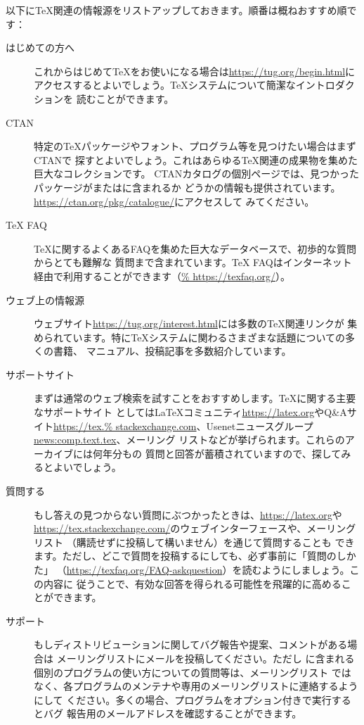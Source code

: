 \documentclass[uplatex,dvipdfmx,12pt]{jsarticle}
\begin{document}
以下に\TeX 関連の情報源をリストアップしておきます。順番は概ねおすすめ順です：
%
\begin{description}
\item[はじめての方へ]
これからはじめて\TeX をお使いになる場合は\url{https://tug.org/begin.html}に
アクセスするとよいでしょう。\TeX システムについて簡潔なイントロダクションを
読むことができます。

\item[CTAN]
特定の\TeX パッケージやフォント、プログラム等を見つけたい場合はまずCTANで
探すとよいでしょう。これはあらゆる\TeX 関連の成果物を集めた巨大なコレクションです。
CTANカタログの個別ページでは、見つかったパッケージが\TL または\MIKTEX に含まれるか
どうかの情報も提供されています。\url{https://ctan.org/pkg/catalogue/}にアクセスして
みてください。

\item[{\TeX} FAQ]
\TeX に関するよくあるFAQを集めた巨大なデータベースで、初歩的な質問からとても難解な
質問まで含まれています。{\TeX} FAQはインターネット経由で利用することができます（\url{%
https://texfaq.org/}）。

\item[ウェブ上の情報源]
ウェブサイト\url{https://tug.org/interest.html}には多数の\TeX 関連リンクが
集められています。特に\TeX システムに関わるさまざまな話題についての多くの書籍、
マニュアル、投稿記事を多数紹介しています。

\item[サポートサイト]
まずは通常のウェブ検索を試すことをおすすめします。\TeX に関する主要なサポートサイト
としては\LaTeX コミュニティ\url{https://latex.org}やQ\&Aサイト\url{https://tex.%
stackexchange.com}、Usenetニュースグループ\url{news:comp.text.tex}、メーリング
リストなどが挙げられます。これらのアーカイブには何年分もの
質問と回答が蓄積されていますので、探してみるとよいでしょう。

\item[質問する]
もし答えの見つからない質問にぶつかったときは、\url{https://latex.org}や
\url{https://tex.stackexchange.com/}のウェブインターフェースや、メーリングリスト
（購読せずに投稿して構いません）を通じて質問することも
できます。ただし、どこで質問を投稿するにしても、必ず事前に「質問のしかた」
（\url{https://texfaq.org/FAQ-askquestion}）を読むようにしましょう。この内容に
従うことで、有効な回答を得られる可能性を飛躍的に高めることができます。

\item[\TL サポート]
もし\TL ディストリビューションに関してバグ報告や提案、コメントがある場合は
\TL メーリングリストにメールを投稿してください。ただし
\TL に含まれる個別のプログラムの使い方についての質問等は、\TL メーリングリスト
ではなく、各プログラムのメンテナや専用のメーリングリストに連絡するようにして
ください。多くの場合、プログラムをオプション付きで実行するとバグ
報告用のメールアドレスを確認することができます。
\end{description}
\end{document}
